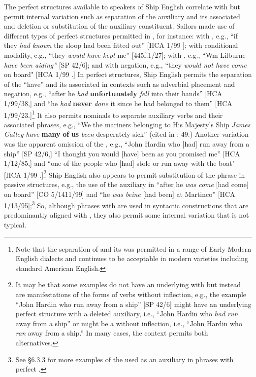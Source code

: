   The perfect structures available to speakers of Ship English correlate with  but permit internal variation such as separation of the auxiliary and its associated  and deletion or substitution of the auxiliary constituent. Sailors made use of different types of perfect structures permitted in , for instance:  with , e.g., “if they \textit{had known} the sloop had been fitted out” [HCA 1/99  \citealt{Islands1722}];  with conditional modality, e.g., “they \textit{would have kept} me” [445f.1/27];  with , e.g., “Wm Lilburne \textit{have been aiding”} [SP 42/6]; and  with negation, e.g., “they \textit{would not have come} on board" [HCA 1/99  \citealt{Islands1722}.] In perfect structures, Ship English permits the separation of the  “have” and its associated   in contexts such as adverbial placement and negation, e.g., “after he \textit{had} \textbf{unfortunately} \textit{fell} into their hands” [HCA 1/99/38,] and “he \textit{had} \textbf{never} \textit{done} it since he had belonged to them” [HCA 1/99/23.]\footnote{Note that the separation of  and its   was permitted in a range of Early Modern English dialects and continues to be acceptable in modern varieties including standard American English.} It also permits nominals to separate auxiliary verbs and their associated   phrases, e.g., “We the mariners belonging to His Majesty’s Ship \textit{James Galley have} \textbf{many} \textbf{of} \textbf{us} \textit{been} desperately sick” (cited in \citealt{Brown2011}: 49.) Another variation was the apparent omission of the , e.g., “John Hardin who [had] run away from a ship” [SP 42/6,] “I thought you would [have] been as you promised me” [HCA 1/12/85,] and “one of the people who [had] stole or run away with the boat" [HCA 1/99  \citealt{Islands1722}.]\footnote{It may be that some examples do not have an underlying  with  but instead are manifestations of the  forms of verbs without  inflection, e.g., the example “John Hardin who run away from a ship” [SP 42/6] might have an underlying perfect structure with a deleted auxiliary, i.e., “John Hardin who \textit{had run} away from a ship” or might be a   without inflection, i.e., “John Hardin who \textit{ran} away from a ship.” In many cases, the context permits both alternatives.}  Ship English also appears to permit substitution of the  phrase in passive structures, e.g., the use of the  auxiliary in “after he \textit{was come} [had come] on board” [CO 5/1411/99] and “he \textit{was beine} [had been] at Martinco” [HCA 1/13/95];\footnote{See §6.3.3 for more examples of the  used as an auxiliary in  phrases with perfect .}  So, although  phrases with  are used in syntactic constructions that are predominantly aligned with , they also permit some internal variation that is not typical. 

